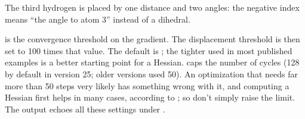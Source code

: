 \documentclass[letterpaper,10pt,english,openany,oneside]{sphinxmanual}
\begin{document}
\begin{sphinxVerbatim}[commandchars=\\\{\}]
\end{sphinxVerbatim}



\sphinxAtStartPar
The third hydrogen is placed by one distance and two angles: the negative index  means “the angle to atom 3”
instead of a dihedral. 

\sphinxAtStartPar
{\hyperref[\detokenize{reference/optimize:optimize-tolerance}]{}} is the convergence threshold on the gradient. The displacement threshold is then set
to 100 times that value. The default is ; the tighter  used in most published examples is a better
starting point for a Hessian. {\hyperref[\detokenize{reference/optimize:optimize-steps}]{}} caps the number of cycles (128 by default in version 25;
older versions used 50). An optimization that needs far more than 50 steps very likely has something wrong with it,
and computing a Hessian first helps in many cases, according to ; so don’t simply raise the limit. The output echoes all these settings under .
\end{document}
